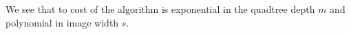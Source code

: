 We see that to cost of the algorithm is exponential in the quadtree depth $m$
and polynomial in image width $s$.









